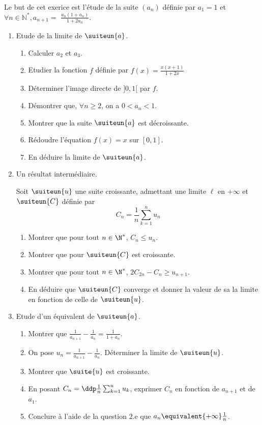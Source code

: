 


\begin{exercice}
Le but de cet exerice est l'étude de  la suite $\left(a_{n}\right)$ définie par $a_{1}=1$ et $\forall n \in \mathbb{N}^{*}, a_{n+1}=$ $\frac{a_{n}\left(1+a_{n}\right)}{1+2 a_{n}} .$

\begin{enumerate}
\item Etude de la limite de $\suiteun{a}$.
\begin{enumerate}

\item  Calculer $a_{2}$ et $a_{3}$.
\item Etudier la fonction $f$ définie par  $f(x) =\frac{x(x+1)}{1+2x}$
\item Déterminer l'image directe de $]0,1[$ par $f$. 
\item  Démontrer que, $\forall n \geqslant 2$, on a $0<a_{n}<1$.
\item Montrer que la suite $\suiteun{a}$ est décroissante.
\item Rédoudre l'équation $f(x)=x$ sur $[0,1]$. 
\item En déduire la limite de $\suiteun{a}$.
\end{enumerate}
\item Un résultat intermédiaire. 

Soit $\suiteun{u} $ une suite croissante, admettant une limite $\ell$ en $+\infty$ et $\suiteun{C}$ définie par 
$$C_n=\frac{1}{n}\sum_{k=1}^n  u_n$$
\begin{enumerate}
\item Montrer que pour tout $n\in \N^*$, $C_n\leq u_n$. 
\item Montrer que pour $\suiteun{C}$ est croissante. 
\item Montrer que pour tout $n\in \N^*$, $2C_{2n}-C_n \geq u_{n+1}$. 
\item En déduire que $\suiteun{C}$ converge et donner la valeur de sa  la limite en fonction de celle de $\suiteun{u}$. 

\end{enumerate}
\item Etude d'un équivalent de $\suiteun{a}$.
\begin{enumerate}
\item Montrer que $\frac{1}{a_{n+1}}-\frac{1}{a_{n}}=\frac{1}{1+a_{n}}$.
\item On pose $u_{n}=\frac{1}{a_{n+1}}-\frac{1}{a_{n}} .$ Déterminer la limite de $\suiteun{u}$.
\item Montrer que $\suite{u}$ est croissante. 
\item En posant $C_{n}=\ddp \frac{1}{n} \sum_{k=1}^{n} u_{k}$, exprimer $C_{n}$ en fonction de $a_{n+1}$ et de $a_{1}$.
\item Conclure à l'aide de la question 2.e que $a_n \equivalent{+\infty} \frac{1}{n}$.
\end{enumerate}
\end{enumerate}


\end{exercice}

